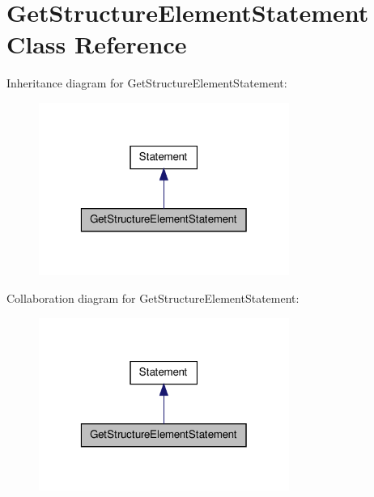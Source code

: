 \hypertarget{class_get_structure_element_statement}{\section{Get\-Structure\-Element\-Statement Class Reference}
\label{class_get_structure_element_statement}
}


Inheritance diagram for Get\-Structure\-Element\-Statement\-:
\nopagebreak
\begin{figure}[H]
\begin{center}
\leavevmode
\includegraphics[width=232pt]{class_get_structure_element_statement__inherit__graph}
\end{center}
\end{figure}


Collaboration diagram for Get\-Structure\-Element\-Statement\-:
\nopagebreak
\begin{figure}[H]
\begin{center}
\leavevmode
\includegraphics[width=232pt]{class_get_structure_element_statement__coll__graph}
\end{center}
\end{figure}
